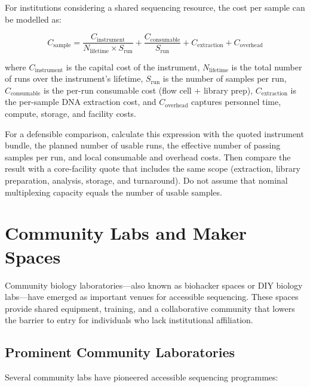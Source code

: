 For institutions considering a shared sequencing resource, the cost per sample can be modelled as:

\begin{equation}
\label{eq:accessible:costsample}
C_{\text{sample}} = \frac{C_{\text{instrument}}}{N_{\text{lifetime}} \times S_{\text{run}}} + \frac{C_{\text{consumable}}}{S_{\text{run}}} + C_{\text{extraction}} + C_{\text{overhead}}
\end{equation}

\noindent where $C_{\text{instrument}}$ is the capital cost of the instrument, $N_{\text{lifetime}}$ is the total number of runs over the instrument's lifetime, $S_{\text{run}}$ is the number of samples per run, $C_{\text{consumable}}$ is the per-run consumable cost (flow cell + library prep), $C_{\text{extraction}}$ is the per-sample DNA extraction cost, and $C_{\text{overhead}}$ captures personnel time, compute, storage, and facility costs.

For a defensible comparison, calculate this expression with the quoted instrument bundle, the planned number of usable runs, the effective number of passing samples per run, and local consumable and overhead costs. Then compare the result with a core-facility quote that includes the same scope (extraction, library preparation, analysis, storage, and turnaround). Do not assume that nominal multiplexing capacity equals the number of usable samples.

\section{Community Labs and Maker Spaces}
\label{sec:accessible:community}

Community biology laboratories---also known as biohacker spaces or DIY biology labs---have emerged as important venues for accessible sequencing. These spaces provide shared equipment, training, and a collaborative community that lowers the barrier to entry for individuals who lack institutional affiliation.

\subsection{Prominent Community Laboratories}
\label{subsec:accessible:communitylabs}

Several community labs have pioneered accessible sequencing programmes:

